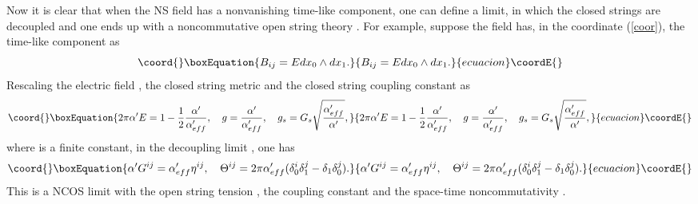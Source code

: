 \documentclass[a4paper,12pt]{article}
\begin{document}
Now it is clear that when the NS \coordHE{} field has a nonvanishing time-like
component, one can define a limit, in which the closed strings are decoupled
and one ends up with a noncommutative open string theory \cite{Seib2,Gopa1}.
 For example, suppose the \coordHE{} field
has, in the coordinate (\ref{coor}), the time-like component as
\begin{equation}\coord{}\boxEquation{
B_{ij}=E dx_0 \wedge dx_1.
}{
B_{ij}=E dx_0 \wedge dx_1.
}{ecuacion}\coordE{}\end{equation}
Rescaling the electric field \coordHE{}, the closed string metric \coordHE{} and the
closed string coupling constant \coordHE{} as
\begin{equation}\coord{}\boxEquation{
\label{ncos}
2\pi \alpha' E =1-\frac{1}{2}\frac{\alpha'}{\alpha'_{eff}},\ \ \
 g=\frac{\alpha'}{\alpha'_{eff}}, \ \ \ g_s=G_s\sqrt{\frac{\alpha'_{eff}}
{\alpha'}},
}{
2\pi \alpha' E =1-\frac{1}{2}\frac{\alpha'}{\alpha'_{eff}},\ \ \
 g=\frac{\alpha'}{\alpha'_{eff}}, \ \ \ g_s=G_s\sqrt{\frac{\alpha'_{eff}}
{\alpha'}},
}{ecuacion}\coordE{}\end{equation}
where \coordHE{} is a finite constant, in the decoupling limit
\myHighlight{$\alpha' \to 0$}\coordHE{}, one has
\begin{equation}\coord{}\boxEquation{
\alpha' G^{ij}=\alpha'_{eff}\eta^{ij}, \ \ \ \Theta^{ij}=2\pi \alpha'_{eff}
 (\delta^i_0\delta^j_1-\delta_1\delta^j_0).
}{
\alpha' G^{ij}=\alpha'_{eff}\eta^{ij}, \ \ \ \Theta^{ij}=2\pi \alpha'_{eff}
 (\delta^i_0\delta^j_1-\delta_1\delta^j_0).
}{ecuacion}\coordE{}\end{equation}
This is a NCOS limit with the open string tension \coordHE{}, the
coupling constant \coordHE{} and the space-time noncommutativity \myHighlight{$\Theta ^{01}
= 2\pi \alpha'_{eff}$}\coordHE{}.
\end{document}
